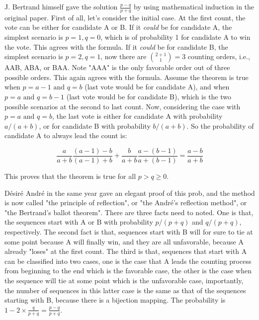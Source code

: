 J. Bertrand himself gave the solution $\frac{p-q}{p+q}$  by using mathematical induction in the original paper. First of all, let's consider the initial case. At the first count, the vote can be either for candidate A or B. If it {\em{could}}  be for candidate A, the simplest scenario is $p=1, q=0$, which is of probability 1 for candidate A to win the vote. This agrees with the formula. If it {\em{could}} be for candidate B, the simplest scenario is $p=2,q=1$, now there are ${2+1 \choose 1} = 3$ counting orders, i.e., AAB, ABA, or BAA. Note "AAA" is the only favorable order out of three possible orders. This again agrees with the formula. Assume the theorem is true when $p=a-1 \mbox{ and } q=b$ (last vote would be for candidate A), and when $p=a \mbox{ and } q=b-1$ (last vote would be for candidate B), which is the two possible scenarios at the second to last count. Now, considering the case with $p=a \mbox{ and } q=b$, the last vote is either for candidate A with probability $a/(a+b)$, or for candidate B with probability $b/(a+b)$. So the probability of candidate A to always lead the count is:


\begin{equation*}
	\frac{a}{a+b} \frac{(a-1)-b}{(a-1)+b} + \frac{b}{a+b} \frac{a-(b-1)}{a+(b-1)} = \frac{a-b}{a+b}
\end{equation*}

This proves that the theorem is true for all $p>q\ge0$.

D\'esir\'e Andr\'e in the same year gave an elegant proof of this prob, and the method is now called "the principle of reflection", or "the Andr\'e's reflection method", or "the Bertrand's ballot theorem". There are three facts need to noted. One is that, the sequences start with A or B with probability $p/(p+q)$ and $q/(p+q)$, respectively. The second fact is that, sequences start with B will for sure to tie at some point because A will finally win, and they are all unfavorable, because A already "loses" at the first count. The third is that, sequences that start with A can be classified into two cases, one is the case that A leads the counting process from beginning to the end which is the favorable case, the other is the case when the sequence will tie at some point which is the unfavorable case, importantly, the number of sequences in this latter case is the same as that of the sequences starting with B, because there is a bijection mapping.  The probability is $1 - 2 \times \frac{q}{p+q} = \frac{p-q}{p+q}$.

